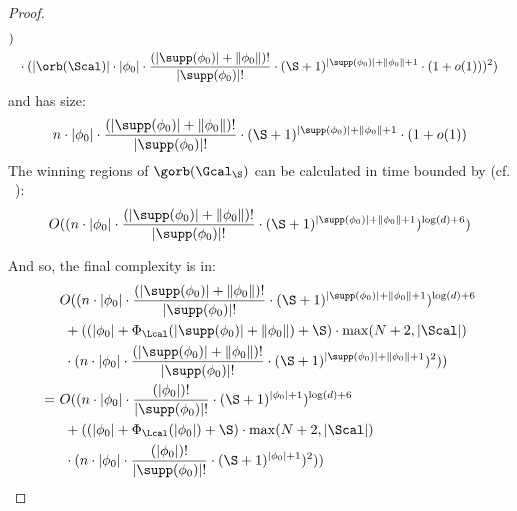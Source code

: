 \begin{proof}
\begin{align*}
	) \\&\ \cdot 
	(|\orb(\Scal)| \cdot|\phi_0|\cdot \frac{(|\supp(\phi_0)|+\|\phi_0\|)!}{|\supp(\phi_0)|!}\cdot (\S + 1)^{|\supp(\phi_0)| + \|\phi_0\| + 1}\cdot(1+o(1)))
	^2)
\end{align*}
and has size:
\[
n \cdot|\phi_0|\cdot \frac{(|\supp(\phi_0)|+\|\phi_0\|)!}{|\supp(\phi_0)|!}\cdot (\S + 1)^{|\supp(\phi_0)| + \|\phi_0\| + 1}\cdot(1+o(1))
\]
The winning regions of $\gorb(\Gcal_\S)$ can be calculated in time bounded by (cf.
~\cite{CaludeJKLS22}):
\[
O((n \cdot|\phi_0|\cdot \frac{(|\supp(\phi_0)| + \|\phi_0\|)!}{|\supp(\phi_0)|!}\cdot (\S + 1)^{|\supp(\phi_0)| + \|\phi_0\| + 1})^{\log(d) + 6})
\]

And so, the final complexity is in:
\begin{align*}
	&O((n \cdot|\phi_0|\cdot \frac{(|\supp(\phi_0)| + \|\phi_0\|)!}{|\supp(\phi_0)|!}\cdot (\S + 1)^{|\supp(\phi_0)| + \|\phi_0\| + 1})^{\log(d) + 6}
	\\ &\ + (
	(|\phi_0| + \Phi_\Lcal(|\supp(\phi_0)| + \|\phi_0\|) + \S)
	\cdot
	\max(N + 2, |\Scal|
	) \\&\ \cdot 
	(n \cdot|\phi_0|\cdot \frac{(|\supp(\phi_0)|+\|\phi_0\|)!}{|\supp(\phi_0)|!}\cdot (\S + 1)^{|\supp(\phi_0)| + \|\phi_0\| + 1})
	^2)
	)
	\\
	=\ &O((n \cdot|\phi_0|\cdot \frac{(|\phi_0|)!}{|\supp(\phi_0)|!}\cdot (\S + 1)^{|\phi_0| + 1})^{\log(d) + 6}
	\\ &\ + (
	(|\phi_0| + \Phi_\Lcal(|\phi_0|) + \S)
	\cdot
	\max(N + 2, |\Scal|
	) \\&\ \cdot 
	(n \cdot|\phi_0|\cdot \frac{(|\phi_0|)!}{|\supp(\phi_0)|!}\cdot (\S + 1)^{|\phi_0| + 1})
	^2)
	)
\end{align*}
\end{proof}

